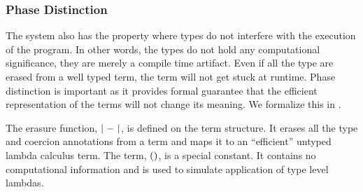 \documentclass[screen,nonacm,manuscript,review]{acmart} %
\begin{document}
\subsubsection{Phase Distinction}
The system also has the property where types do not
interfere with the execution of the program. In other words,
the types do not hold any computational significance,
they are merely a compile time artifact.
Even if all the type are erased from a well typed term,
the term will not get stuck at runtime.
Phase distinction is important as it provides formal
guarantee that the efficient representation of the terms will not
change its meaning. We formalize this in
.

The erasure function, $|~{-}~|$, is defined on the term structure.
It erases all the type and coercion annotations from a \SFC term and
maps it to an ``efficient'' untyped lambda calculus term. The term, $()$, is a
special constant. It contains no computational information and is
used to simulate application of type level lambdas.
\end{document}
